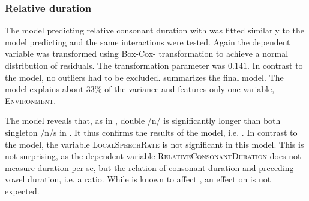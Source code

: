 \subsubsection{Relative duration}


The model predicting relative consonant duration with  was fitted similarly to the model predicting  and the same interactions were tested. Again the dependent variable was transformed using Box-Cox- transformation to achieve a normal distribution of residuals. The transformation parameter was $0.141$. In contrast to the  model, no outliers had to be excluded. 
  summarizes the final model. The model explains about 33\% of the variance and features only one variable, \textsc{Environment}.



\begin{table}
	\caption{ Summary of linear model for variables predicting the Box-Cox-transformed relative duration of [n] in prefixed words}
	\label{tbl: summary corpus un rel dur}
	
		
	
\end{table}



The model reveals that, as in , double /n/ is significantly longer than both singleton /n/s in . It thus confirms the results of the  model, i.e.  . In contrast to the  model, the variable \textsc{LocalSpeechRate} is not significant in this model. This is not surprising, as the dependent variable \textsc{RelativeConsonantDuration} does not measure duration per se, but the relation of consonant duration and preceding vowel duration, i.e. a ratio. While  is known to affect , an effect on  is not expected. 

